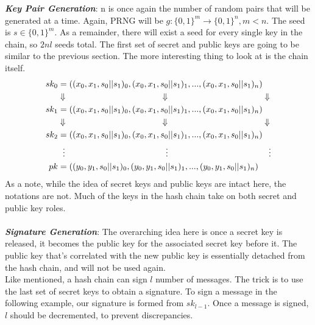 \documentclass[]{scrartcl}
\makeatletter
\newcommand{\mathcenter}{\@fleqnfalse}
\makeatother
\begin{document}
\textbf{\textit{Key Pair Generation}}: n is once again the number of random pairs that will be generated at a time. Again, PRNG will be $g : \{0,1\}^m \rightarrow \{0,1\}^n, m < n$. The seed is $s \in \{0,1\}^m$. As a remainder, there will exist a seed for every single key in the chain, so $2nl$ seeds total. The first set of secret and public keys are going to be similar to the previous section. The more interesting thing to look at is the chain itself.
\mathcenter
\begin{equation}
\begin{split}
sk_0 & = ((x_0, x_1, s_0||s_1)_0,(x_0, x_1, s_0||s_1)_1,...,(x_0, x_1, s_0||s_1)_n)\\
& \Downarrow \hspace{4cm}\Downarrow \hspace{4cm}\Downarrow \\
sk_1 & = ((x_0, x_1, s_0||s_1)_0,(x_0, x_1, s_0||s_1)_1,...,(x_0, x_1, s_0||s_1)_n) \\
& \Downarrow \hspace{4cm}\Downarrow \hspace{4cm}\Downarrow \\
sk_2 & = ((x_0, x_1, s_0||s_1)_0,(x_0, x_1, s_0||s_1)_1,...,(x_0, x_1, s_0||s_1)_n) \\
& \hspace{0.2cm}\vdots \hspace{4.15cm}\vdots \hspace{4.15cm}\vdots \\
pk & = ((y_0, y_1, s_0||s_1)_0,(y_0, y_1, s_0||s_1)_1,...,(y_0, y_1, s_0||s_1)_n) \\
\end{split}
\end{equation}
As a note, while the idea of secret keys and public keys are intact here, the notations are not. Much of the keys in the hash chain take on both secret and public key roles. \\ \\
\textbf{\textit{Signature Generation}}: The overarching idea here is once a secret key is released, it becomes the public key for the associated secret key before it. The public key that's correlated with the new public key is essentially detached from the hash chain, and will not be used again.\\
Like mentioned, a hash chain can sign $l$ number of messages. The trick is to use the last set of secret keys to obtain a signature. To sign a message in the following example, our signature is formed from $sk_{l-1}$. Once a message is signed, $l$ should be decremented, to prevent discrepancies. 
\end{document}
